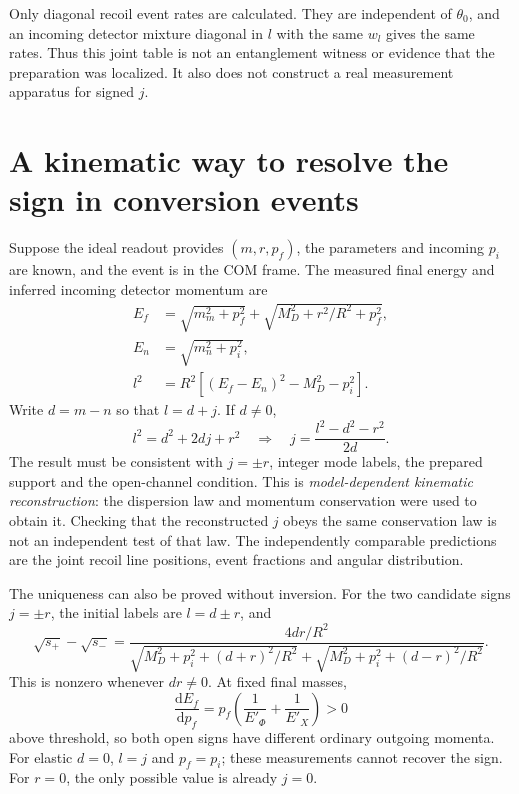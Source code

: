 \documentclass[11pt,a4paper]{article}
\newcommand{\dd}{\mathrm d}
\begin{document}
Only diagonal recoil event rates are calculated. They are independent
of $\theta_0$, and an incoming detector mixture diagonal in $l$ with
the same $w_l$ gives the same rates. Thus this joint table is not an
entanglement witness or evidence that the preparation was localized.
It also does not construct a real measurement apparatus for signed $j$.

\section{A kinematic way to resolve the sign in conversion events}
Suppose the ideal readout provides $(m,r,p_f)$, the parameters and
incoming $p_i$ are known, and the event is in the COM frame.
The measured final energy and inferred incoming detector momentum are
\begin{align}
 E_f&=\sqrt{m_m^2+p_f^2}
        +\sqrt{M_D^2+r^2/R^2+p_f^2},\\
 E_n&=\sqrt{m_n^2+p_i^2},\\
 l^2&=R^2\left[(E_f-E_n)^2-M_D^2-p_i^2\right].
\end{align}
Write $d=m-n$ so that $l=d+j$. If $d\ne0$,
\begin{equation}\label{eq:reconstruct}
 l^2=d^2+2dj+r^2
 \quad\Longrightarrow\quad
 \boxed{j=\frac{l^2-d^2-r^2}{2d}} .
\end{equation}
The result must be consistent with $j=\pm r$, integer mode labels,
the prepared support and the open-channel condition. This is
\emph{model-dependent kinematic reconstruction}: the dispersion law
and momentum conservation were used to obtain it. Checking that the
reconstructed $j$ obeys the same conservation law is not an independent
test of that law. The independently comparable predictions are the
joint recoil line positions, event fractions and angular distribution.

The uniqueness can also be proved without inversion. For the two
candidate signs $j=\pm r$, the initial labels are $l=d\pm r$, and
\begin{equation}
 \sqrt{s_+}-\sqrt{s_-}
 =\frac{4dr/R^2}
 {\sqrt{M_D^2+p_i^2+(d+r)^2/R^2}
  +\sqrt{M_D^2+p_i^2+(d-r)^2/R^2}}.
\end{equation}
This is nonzero whenever $dr\ne0$. At fixed final masses,
\begin{equation}
 \frac{\dd E_f}{\dd p_f}
 =p_f\left(\frac1{E'_\Phi}+\frac1{E'_X}\right)>0
\end{equation}
above threshold, so both open signs have different ordinary
outgoing momenta. For elastic $d=0$, $l=j$ and $p_f=p_i$;
these measurements cannot recover the sign. For $r=0$, the
only possible value is already $j=0$.
\end{document}
